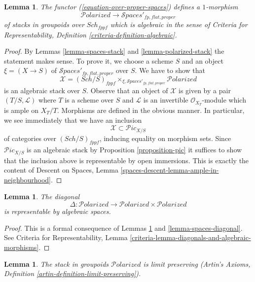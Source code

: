 \documentclass{stacks-project}
\theoremstyle{plain}
\newtheorem{lemma}[subsection]{Lemma}
\theoremstyle{definition}
\theoremstyle{remark}
\numberwithin{equation}{subsection}
\def\Sch{\mathit{Sch}}
\def\Spacesstack{\mathcal{S}\!\mathit{paces}}
\def\Polarizedstack{\mathcal{P}\!\mathit{olarized}}
\def\Picardstack{\mathcal{P}\!\mathit{ic}}
\begin{document}
\begin{lemma}
\label{lemma-polarized-to-spaces-algebraic}
The functor (\ref{equation-over-proper-spaces}) defines a $1$-morphism
$$
\Polarizedstack \to \Spacesstack'_{fp, flat, proper}
$$
of stacks in groupoids over $\Sch_{fppf}$
which is algebraic in the sense of
Criteria for Representability, Definition
\ref{criteria-definition-algebraic}.
\end{lemma}

\begin{proof}
By Lemmas \ref{lemma-spaces-stack} and \ref{lemma-polarized-stack}
the statement makes sense. To prove it, we choose a scheme $S$
and an object $\xi = (X \to S)$ of $\Spacesstack'_{fp, flat, proper}$
over $S$. We have to show that
$$
\mathcal{X} = (\Sch/S)_{fppf} \times_{\xi, \Spacesstack'_{fp, flat, proper}}
\Polarizedstack
$$
is an algebraic stack over $S$. Observe that an object of $\mathcal{X}$
is given by a pair $(T/S, \mathcal{L})$ where $T$ is a scheme
over $S$ and $\mathcal{L}$ is an invertible $\mathcal{O}_{X_T}$-module
which is ample on $X_T/T$. Morphisms are defined in the obvious manner.
In particular, we see immediately that we have an inclusion
$$
\mathcal{X} \subset \Picardstack_{X/S}
$$
of categories over $(\Sch/S)_{fppf}$, inducing equality on morphism
sets. Since $\Picardstack_{X/S}$ is an algebraic stack by
Proposition \ref{proposition-pic} it suffices to show that the inclusion
above is representable by open immersions. This is exactly the content
of Descent on Spaces, Lemma
\ref{spaces-descent-lemma-ample-in-neighbourhood}.
\end{proof}

\begin{lemma}
\label{lemma-polarized-diagonal}
The diagonal
$$
\Delta : \Polarizedstack \longrightarrow
\Polarizedstack \times \Polarizedstack
$$
is representable by algebraic spaces.
\end{lemma}

\begin{proof}
This is a formal consequence of
Lemmas \ref{lemma-polarized-to-spaces-algebraic} and
\ref{lemma-spaces-diagonal}.
See Criteria for Representability, Lemma
\ref{criteria-lemma-diagonals-and-algebraic-morphisms}.
\end{proof}

\begin{lemma}
\label{lemma-polarized-limits}
The stack in groupoids $\Polarizedstack$ is limit preserving
(Artin's Axioms, Definition \ref{artin-definition-limit-preserving}).
\end{lemma}
\end{document}
